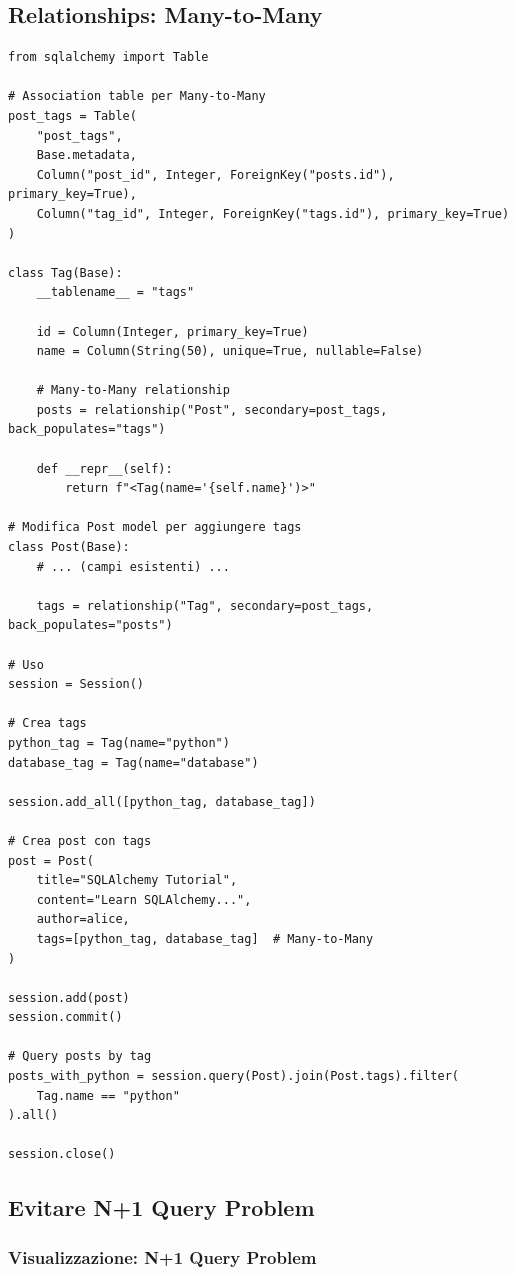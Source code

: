 \subsection{Relationships: Many-to-Many}

\begin{lstlisting}
from sqlalchemy import Table

# Association table per Many-to-Many
post_tags = Table(
    "post_tags",
    Base.metadata,
    Column("post_id", Integer, ForeignKey("posts.id"), primary_key=True),
    Column("tag_id", Integer, ForeignKey("tags.id"), primary_key=True)
)

class Tag(Base):
    __tablename__ = "tags"

    id = Column(Integer, primary_key=True)
    name = Column(String(50), unique=True, nullable=False)

    # Many-to-Many relationship
    posts = relationship("Post", secondary=post_tags, back_populates="tags")

    def __repr__(self):
        return f"<Tag(name='{self.name}')>"

# Modifica Post model per aggiungere tags
class Post(Base):
    # ... (campi esistenti) ...

    tags = relationship("Tag", secondary=post_tags, back_populates="posts")

# Uso
session = Session()

# Crea tags
python_tag = Tag(name="python")
database_tag = Tag(name="database")

session.add_all([python_tag, database_tag])

# Crea post con tags
post = Post(
    title="SQLAlchemy Tutorial",
    content="Learn SQLAlchemy...",
    author=alice,
    tags=[python_tag, database_tag]  # Many-to-Many
)

session.add(post)
session.commit()

# Query posts by tag
posts_with_python = session.query(Post).join(Post.tags).filter(
    Tag.name == "python"
).all()

session.close()
\end{lstlisting}

\subsection{Evitare N+1 Query Problem}

\subsubsection{Visualizzazione: N+1 Query Problem}

